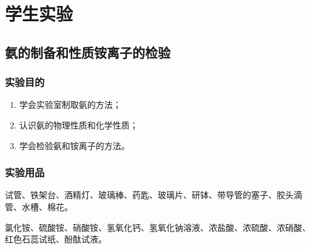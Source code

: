 \chapter*{学生实验}
\renewcommand{\thefigure}{\arabic{figure}}
\renewcommand{\thetable}{\arabic{table}}

\section{氨的制备和性质\texorpdfstring{\quad}{ }铵离子的检验}
\subsection*{实验目的}
\begin{enumerate}[1.]
  \item 学会实验室制取氨的方法；
  \item 认识氨的物理性质和化学性质；
  \item 学会检验氨和铵离子的方法。
\end{enumerate}
\subsection*{实验用品}
试管、铁架台、酒精灯、玻璃棒、药匙、玻璃片、研钵、带导管的塞子、胶头滴管、水槽、棉花。

氯化铵、硫酸铵、硝酸铵、氢氧化钙、氢氧化钠溶液、浓盐酸、浓硫酸、浓硝酸、红色石蕊试纸、酚酞试液。
